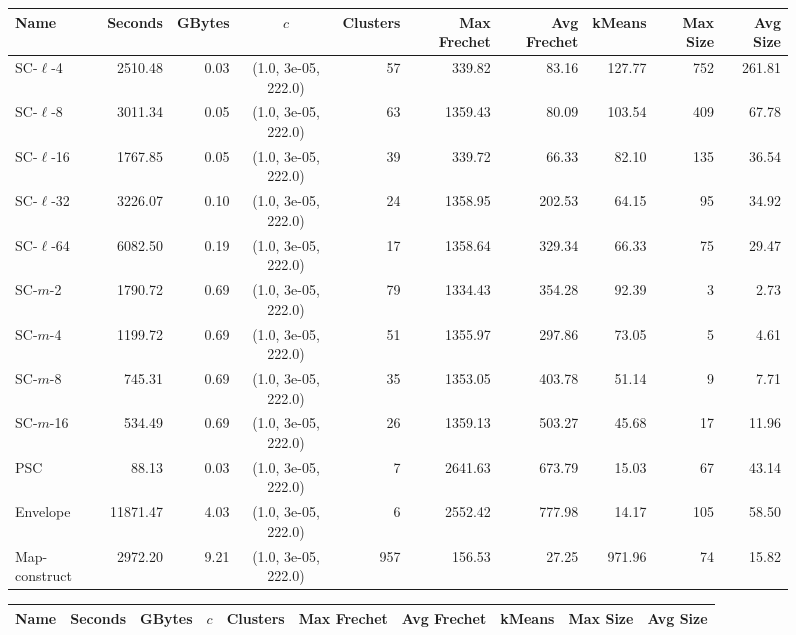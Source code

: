 \begin{figure} \begin{center}
    \begin{minipage}{\textwidth}
    {
    \begin{tabular}{@{}lrrcrrrrrr@{}}
        \toprule
        Name & Seconds & GBytes & $c$ & Clusters & Max Frechet & Avg Frechet & kMeans & Max Size & Avg Size\\
        \midrule
        SC-$\ell$-4 & 2510.48 & 0.03 & (1.0, 3e-05, 222.0) & 57 & 339.82 & 83.16 & 127.77 & 752 & 261.81\\
        SC-$\ell$-8 & 3011.34 & 0.05 & (1.0, 3e-05, 222.0) & 63 & 1359.43 & 80.09 & 103.54 & 409 & 67.78\\
        SC-$\ell$-16 & 1767.85 & 0.05 & (1.0, 3e-05, 222.0) & 39 & 339.72 & 66.33 & 82.10 & 135 & 36.54\\
        SC-$\ell$-32 & 3226.07 & 0.10 & (1.0, 3e-05, 222.0) & 24 & 1358.95 & 202.53 & 64.15 & 95 & 34.92\\
        SC-$\ell$-64 & 6082.50 & 0.19 & (1.0, 3e-05, 222.0) & 17 & 1358.64 & 329.34 & 66.33 & 75 & 29.47\\
        SC-$m$-2 & 1790.72 & 0.69 & (1.0, 3e-05, 222.0) & 79 & 1334.43 & 354.28 & 92.39 & 3 & 2.73\\
        SC-$m$-4 & 1199.72 & 0.69 & (1.0, 3e-05, 222.0) & 51 & 1355.97 & 297.86 & 73.05 & 5 & 4.61\\
        SC-$m$-8 & 745.31 & 0.69 & (1.0, 3e-05, 222.0) & 35 & 1353.05 & 403.78 & 51.14 & 9 & 7.71\\
        SC-$m$-16 & 534.49 & 0.69 & (1.0, 3e-05, 222.0) & 26 & 1359.13 & 503.27 & 45.68 & 17 & 11.96\\
        PSC & 88.13 & 0.03 & (1.0, 3e-05, 222.0) & 7 & 2641.63 & 673.79 & 15.03 & 67 & 43.14\\
        Envelope & 11871.47 & 4.03 & (1.0, 3e-05, 222.0) & 6 & 2552.42 & 777.98 & 14.17 & 105 & 58.50\\
        Map-construct & 2972.20 & 9.21 & (1.0, 3e-05, 222.0) & 957 & 156.53 & 27.25 & 971.96 & 74 & 15.82\\
        \bottomrule
    \end{tabular}
    }
    {
    \begin{tabular}{@{}lrrcrrrrrr@{}}
        \toprule
        Name & Seconds & GBytes & $c$ & Clusters & Max Frechet & Avg Frechet & kMeans & Max Size & Avg Size\\
        \midrule

\end{tabular}}
\end{minipage}
\end{center}
\end{figure}
